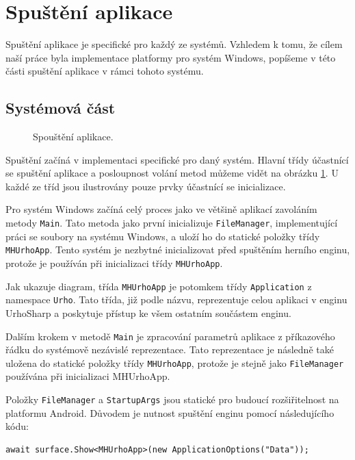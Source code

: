 \section{Spuštění aplikace}
\label{sec:init}
Spuštění aplikace je specifické pro každý ze systémů. Vzhledem k tomu, že cílem naší práce byla implementace platformy pro systém Windows, popíšeme v této části spuštění aplikace v rámci tohoto systému.

\subsection{Systémová část}

\begin{figure}[h]
	\centering
	\fontsize{8pt}{11pt}\selectfont
	\def\svgwidth{\textwidth}
	
	\caption{Spouštění aplikace.}
	\label{fig:startup}
\end{figure}

Spuštění začíná v implementaci specifické pro daný systém. Hlavní třídy účastnící se spuštění aplikace a posloupnost volání metod můžeme vidět na obrázku \ref{fig:startup}. U každé ze tříd jsou ilustrovány pouze prvky účastnící se inicializace. 

Pro systém Windows začíná celý proces jako ve většině aplikací zavoláním metody \texttt{Main}. Tato metoda jako první inicializuje \texttt{FileManager}, implementující práci se soubory na systému Windows, a uloží ho do statické položky třídy \texttt{MHUrhoApp}. Tento systém je nezbytné inicializovat před spuštěním herního enginu, protože je používán při inicializaci třídy \texttt{MHUrhoApp}.

Jak ukazuje diagram, třída \texttt{MHUrhoApp} je potomkem třídy \texttt{Application} z namespace \texttt{Urho}. Tato třída, již podle názvu, reprezentuje celou aplikaci v enginu UrhoSharp a poskytuje přístup ke všem ostatním součástem enginu. 

Dalším krokem v metodě \texttt{Main} je zpracování parametrů aplikace z příkazového řádku do systémově nezávislé reprezentace. Tato reprezentace je následně také uložena do statické položky třídy \texttt{MHUrhoApp}, protože je stejně jako \texttt{FileManager} používána při inicializaci MHUrhoApp.

Položky \texttt{FileManager} a \texttt{StartupArgs} jsou statické pro budoucí rozšiřitelnost na platformu Android.
Důvodem je nutnost spuštění enginu pomocí následujícího kódu:

\begin{lstlisting}
await surface.Show<MHUrhoApp>(new ApplicationOptions("Data"));
\end{lstlisting}

